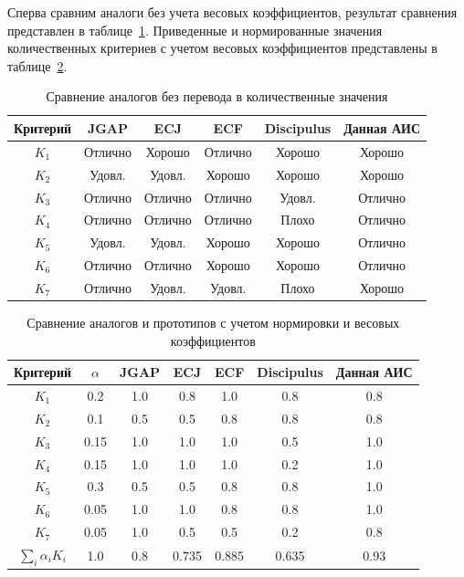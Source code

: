 \documentclass[russian,utf8,emptystyle]{eskdtext}
\begin{document}
\begin{spacing}{1.5}
Сперва сравним аналоги без учета весовых коэффициентов, результат сравнения представлен в таблице~\ref{tab:analog_compare_phase1}. Приведенные и нормированные значения количественных критериев с учетом весовых коэффициентов представлены в таблице~\ref{tab:analog_compare_phase2}.

\begin{table}
\centering
\caption{Сравнение аналогов без перевода в количественные значения}
\label{tab:analog_compare_phase1}
\begin{tabular}{c|c|c|c|c|c}
Критерий & JGAP & ECJ & ECF & Discipulus & Данная АИС \\ 
\hline 
$K_1$ & Отлично & Хорошо & Отлично & Хорошо & Хорошо \\ 
\hline 
$K_2$ & Удовл. & Удовл. & Хорошо & Хорошо & Хорошо \\ 
\hline 
$K_3$ & Отлично & Отлично & Отлично & Удовл. & Отлично \\ 
\hline 
$K_4$ & Отлично & Отлично & Отлично & Плохо & Отлично \\ 
\hline 
$K_5$ & Удовл. & Удовл. & Хорошо & Хорошо & Отлично \\ 
\hline 
$K_6$ & Отлично & Отлично & Хорошо & Хорошо & Отлично \\ 
\hline 
$K_7$ & Отлично & Удовл. & Удовл. & Плохо & Хорошо 
\end{tabular} 
\end{table}

\begin{table}
\centering
\caption{Сравнение аналогов и прототипов с учетом нормировки и весовых коэффициентов}
\label{tab:analog_compare_phase2}
\begin{tabular}{c|c|c|c|c|c|c}
Критерий & $\alpha$ & JGAP & ECJ & ECF & Discipulus & Данная АИС \\ 
\hline 
$K_1$ & 0.2 & 1.0 & 0.8 & 1.0 & 0.8 & 0.8 \\ 
\hline 
$K_2$ & 0.1 & 0.5 & 0.5 & 0.8 & 0.8 & 0.8 \\ 
\hline 
$K_3$ & 0.15 & 1.0 & 1.0 & 1.0 & 0.5 & 1.0 \\ 
\hline 
$K_4$ & 0.15 & 1.0 & 1.0 & 1.0 & 0.2 & 1.0 \\ 
\hline 
$K_5$ & 0.3 & 0.5 & 0.5 & 0.8 & 0.8 & 1.0 \\ 
\hline 
$K_6$ & 0.05 & 1.0 & 1.0 & 0.8 & 0.8 & 1.0 \\ 
\hline 
$K_7$ & 0.05 & 1.0 & 0.5 & 0.5 & 0.2 & 0.8 \\ 
\hline 
$\sum_i \alpha_i K_i$ & 1.0 & 0.8 & 0.735 & 0.885 & 0.635 & 0.93  
\end{tabular} 
\end{table}


\end{spacing}
\end{document}
